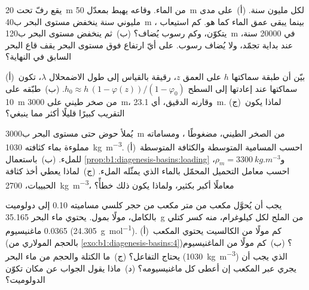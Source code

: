 \begin{exercise}[$\star\star$]\label{exo:b1:diagenesis-basins:9}
يقع رفّ تحت \qty{20}{m} من الماء. وقاعه يهبط بمعدّل \qty{50}{m} لكل مليون سنة. (أ)~على مدى مليوني سنة ينخفض مستوى البحر ب\qty{40}{m} ، بينما يبقى عمق الماء كما هو. كم استيعاب يتكوّن، وكم رسوب يُضاف؟ (ب)~ثم ينخفض مستوى البحر ب\qty{120}{m} في \num{20000} سنة، عند بداية تجمّد، ولا يُضاف رسوب. على أيّ ارتفاع فوق مستوى البحر يقف قاع البحر السابق في النهاية؟
\end{exercise}

\begin{exercise}[$\star\star\star$]\label{exo:b1:diagenesis-basins:10}
(أ)~بيّن أن طبقة سماكتها $h$ على العمق $z$، رقيقة بالقياس إلى طول الاضمحلال $\lambda$، تكون سماكتها عند إعادتها إلى السطح $h_0 \approx h\,(1 - \varphi(z))/(1 -
\varphi_0)$. (ب)~طبّقه على \qty{10}{m} من صخر طيني على \qty{3000}{m}، وقارنه  الدقيق، أي \qty{23.1}{m}. (ج)~لماذا يكون التقريب كبيرًا قليلًا أكثر مما ينبغي؟
\end{exercise}

\begin{exercise}[$\star\star\star$]\label{exo:b1:diagenesis-basins:11}
يُملأ حوض حتى مستوى البحر ب\qty{3000}{m} من الصخر الطيني، مضغوطًا ، ومساماته مملوءة بماء كثافته \qty{1030}{kg.m^{-3}}. (أ)~احسب المسامية المتوسطة والكثافة المتوسطة للملء. (ب)~باستعمال \cref{prop:b1:diagenesis-basins:loading} و$\rho_m =
\qty{3300}{kg.m^{-3}}$، احسب معامل التحميل  المحمّل بالماء الذي يمثّله الملء. (ج)~لماذا يعطي أخذ كثافة الحبيبات، \qty{2700}{kg.m^{-3}}، معاملًا أكبر بكثير، ولماذا يكون ذلك خطأً؟
\end{exercise}

\begin{exercise}[$\star\star\star$]\label{exo:b1:diagenesis-basins:12}
يجب أن يُحوَّل مكعب من متر مكعب من حجر كلسي مساميته \num{0.10} إلى دولوميت بالكامل، مولًا بمول. يحتوي ماء البحر \qty{35.165}{g} من الملح لكل كيلوغرام، منه كسر كتلي \num{0.0365} ماغنيسيوم (\qty{24.305}{g.mol^{-1}}). (أ)~كم مولًا من الكالسيت يحتوي المكعب (بالحجم المولاري من \cref{exo:b1:diagenesis-basins:4})؟ (ب)~كم مولًا من الماغنيسيوم يحتاج التفاعل؟ (ج)~ما الكتلة والحجم من ماء البحر (\qty{1030}{kg.m^{-3}}) الذي يجب أن يجري عبر المكعب إن أعطى كل ماغنيسيومه؟ (د)~ماذا يقول الجواب عن مكان تكوّن الدولوميت؟
\end{exercise}

